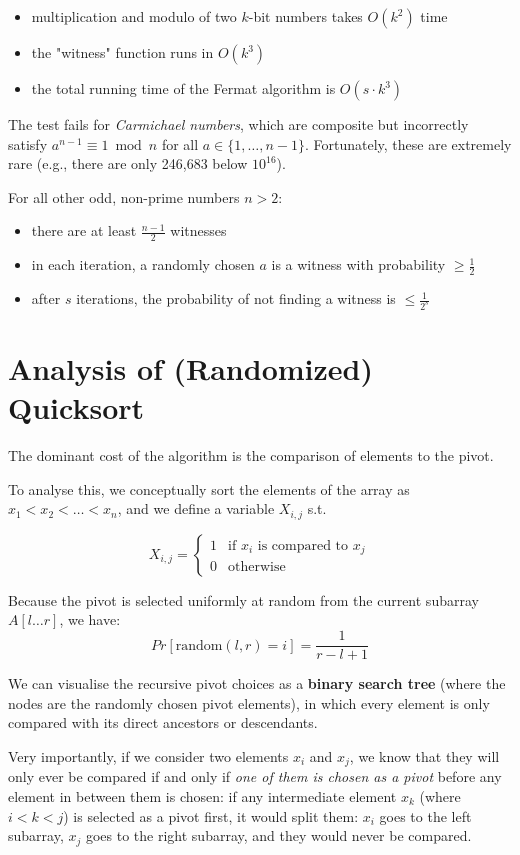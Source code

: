 \documentclass[a4paper, 11pt]{report}
\begin{document}
\begin{itemize}
    \item multiplication and modulo of two $k$-bit numbers takes $O(k^2)$ time
    \item the "witness" function runs in $O(k^3)$
    \item the total running time of the Fermat algorithm is $O(s \cdot k^3)$
\end{itemize}

The test fails for \textit{Carmichael numbers}, which are composite but incorrectly satisfy $a^{n-1} \equiv 1 \bmod n$ for all $a \in \{1, \dots, n-1\}$. Fortunately, these are extremely rare (e.g., there are only 246,683 below $10^{16}$).

For all other odd, non-prime numbers $n > 2$:
\begin{itemize}
    \item there are at least $\frac{n-1}{2}$ witnesses
    \item in each iteration, a randomly chosen $a$ is a witness with probability $\ge \frac{1}{2}$
    \item after $s$ iterations, the probability of not finding a witness is $\le \frac{1}{2^s}$
\end{itemize}

\section{Analysis of (Randomized) Quicksort}
The dominant cost of the algorithm is the comparison of elements to the pivot.

To analyse this, we conceptually sort the elements of the array as $x_{1} < x_{2} < \dots < x_{n}$, and we define a variable $X_{i,j}$ s.t. 
 
    $$X_{i,j} = \begin{cases} 1 & \text{if } x_i \text{ is compared to } x_j \\ 0 & \text{otherwise} \end{cases}$$
    
Because the pivot is selected uniformly at random from the current subarray $A[l \dots r]$, we have:
    $$Pr[\text{random}(l,r) = i] = \frac{1}{r-l+1}$$

We can visualise the recursive pivot choices as a \textbf{binary search tree} (where the nodes are the randomly chosen pivot elements), in which every element is only compared with its direct ancestors or descendants.

Very importantly, if we consider two elements $x_{i}$ and $x_{j}$, we know that they will only ever be compared if and only if \textit{one of them is chosen as a pivot} before any element in between them is chosen: if any intermediate element $x_k$ (where $i < k < j$) is selected as a pivot first, it would split them: $x_i$ goes to the left subarray, $x_j$ goes to the right subarray, and they would never be compared.
\end{document}
